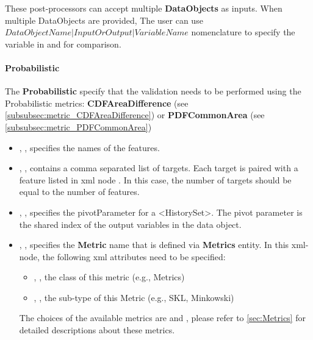These post-processors can accept multiple \textbf{DataObjects} as inputs. When multiple DataObjects are provided,
The user can use $DataObjectName|InputOrOutput|VariableName$ nomenclature to specify the variable
in  and  for comparison.

\paragraph{Probabilistic}
The \textbf{Probabilistic} specify that the validation needs to be performed
using the Probabilistic metrics: \textbf{CDFAreaDifference} (see \ref{subsubsec:metric_CDFAreaDifference})
or \textbf{PDFCommonArea} (see \ref{subsubsec:metric_PDFCommonArea})

%
%

\begin{itemize}
  \item {}, , specifies the names of the features.
  \item {}, , contains a comma separated list of
    targets. \nb Each target is paired with a feature listed in xml node . In this case, the
    number of targets should be equal to the number of features.
  \item {}, , specifies the pivotParameter for a <HistorySet>.
    The pivot parameter is the shared index of the output variables in the data object.
  \item {}, , specifies the \textbf{Metric} name that is defined via
    \textbf{Metrics} entity. In this xml-node, the following xml attributes need to be specified:
    \begin{itemize}
      \item {}, , the class of this metric (e.g., Metrics)
      \item {}, , the sub-type of this Metric (e.g., SKL, Minkowski)
    \end{itemize}
    \nb The choices of the available metrics are  and , please
    refer to \ref{sec:Metrics} for detailed descriptions about these metrics.
\end{itemize}


